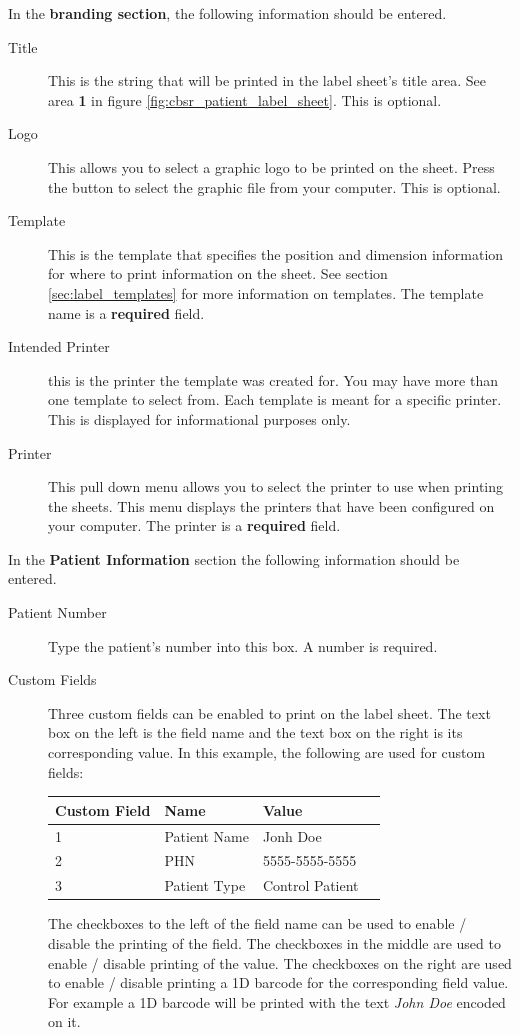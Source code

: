 In the \textbf{branding section}, the following information should be entered.

\begin{description}
\item[Title] This is the string that will be printed in the label sheet's title
  area. See area \textbf{1} in figure \ref{fig:cbsr_patient_label_sheet}. This
  is optional.
\item[Logo] This allows you to select a graphic logo to be printed on the
  sheet. Press the  button to select the graphic file from your
  computer. This is optional.
\item[Template] This is the template that specifies the position and dimension
  information for where to print information on the sheet. See section
  \ref{sec:label_templates} for more information on templates. The template
  name is a \textbf{required} field.
\item[Intended Printer] this is the printer the template was created for. You
  may have more than one template to select from. Each template is meant for a
  specific printer. This is displayed for informational purposes only.
\item[Printer] This pull down menu allows you to select the printer to use when
  printing the sheets. This menu displays the printers that have been
  configured on your computer. The printer is a \textbf{required} field.
\end{description}

In the \textbf{Patient Information} section the following information should be
entered.

\begin{description}
\item[Patient Number] Type the patient's number into this box. A number is required.
\item[Custom Fields] Three custom fields can be enabled to print on the
  label sheet. The text box on the left is the field name and the text box on
  the right is its corresponding value. In this example, the following are used
  for custom fields:

  \begin{center}
    \begin{tabular}{ | l | l | l | p{5cm} |}
      \hline
      Custom Field & Name & Value \\ \hline
      1 & Patient Name & Jonh Doe \\ \hline
      2 & PHN & 5555-5555-5555 \\ \hline
      3 & Patient Type & Control Patient \\
      \hline
    \end{tabular}
  \end{center}

  The checkboxes to the left of the field name can be used to enable / disable
  the printing of the field. The checkboxes in the middle are used to enable /
  disable printing of the value. The checkboxes on the right are used to enable
  / disable printing a 1D barcode for the corresponding field value. For
  example a 1D barcode will be printed with the text \emph{John Doe} encoded on
  it.
\end{description}

